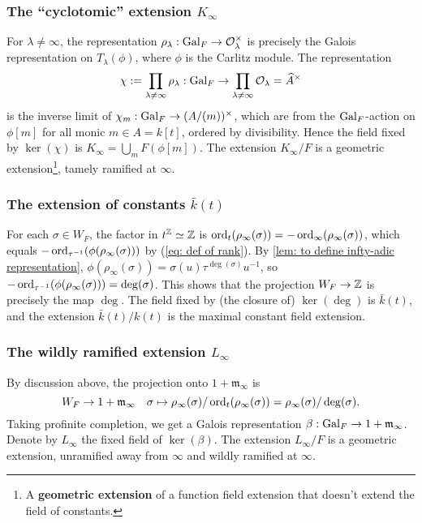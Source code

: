 \documentclass{article}
\renewcommand{\O}{\mathcal{O}}
\newcommand{\m}{\mathfrak{m}}
\begin{document}
\subsubsection*{The ``cyclotomic'' extension \texorpdfstring{$K_\infty$}{K_infty}}
For $\lambda\ne\infty$, the representation $\rho_\lambda : \gal_F\to \O_\lambda^\times$ is precisely the Galois representation on $T_\lambda(\phi)$, where $\phi$ is the Carlitz module.
The representation \[\chi := \prod_{\lambda\ne\infty}\rho_\lambda : \gal_F\to \prod_{\lambda\ne\infty}\O_\lambda = \hat A^\times\]
is the inverse limit of $\chi_m : \operatorname{Gal}_F\to (A/(m))^\times$, which are from the $\operatorname{Gal}_F$-action on $\phi[m]$ for all monic $m\in A = k[t]$, ordered by divisibility.
Hence the field fixed by $\ker(\chi)$ is $K_\infty = \bigcup_{m} F(\phi[m])$.
The extension $K_\infty/F$ is a geometric extension\footnote{A \textbf{geometric extension} of a function field extension that doesn't extend the field of constants.}, tamely ramified at $\infty$.

\subsubsection*{The extension of constants \texorpdfstring{$\bar{k}(t)$}{bark(t)}}
For each $\sigma\in W_F$, the factor in $t^{\mathbb{Z}}\simeq \mathbb{Z}$ is
$\operatorname{ord}_{t}(\rho_\infty(\sigma)) = - \operatorname{ord}_{\infty}(\rho_\infty(\sigma))$, which equals $-\operatorname{ord}_{\tau^{-1}}(\phi(\rho_\infty(\sigma)))$ by (\ref{eq: def of rank}).
By \cref{lem: to define infty-adic representation}, $\phi(\rho_\infty(\sigma)) = \sigma(u)\tau^{\deg(\sigma)}u^{-1}$,
so $-\operatorname{ord}_{\tau^{-1}}(\phi(\rho_\infty(\sigma))) = \deg(\sigma)$.
This shows that the projection $W_F\to \mathbb{Z}$ is precisely the map $\deg$.
The field fixed by (the closure of) $\ker(\deg)$ is $\bar{k}(t)$,
and the extension $\bar{k}(t)/k(t)$ is the maximal constant field extension.


\subsubsection*{The wildly ramified extension \texorpdfstring{$L_\infty$}{L_\infty}}
By discussion above, the projection onto $1 + \m_\infty$ is
\[W_F\to 1 + \m_\infty\quad \sigma\mapsto \rho_\infty(\sigma)/\ord_t(\rho_\infty(\sigma)) = \rho_\infty(\sigma)/\deg(\sigma).\]
Taking profinite completion, we get a Galois representation
$\beta : \gal_F\to 1 + \m_\infty$.
Denote by $L_\infty$ the fixed field of $\ker(\beta)$.
The extension $L_\infty/F$ is a geometric extension, unramified away from $\infty$ and wildly ramified at $\infty$.
\end{document}
